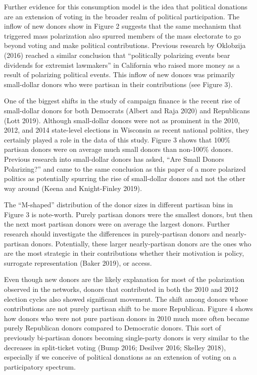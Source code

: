 \documentclass[12pt,]{article}
\begin{document}
Further evidence for this consumption model is the idea that political
donations are an extension of voting in the broader realm of political
participation. The inflow of new donors show in Figure 2 suggests that
the same mechanism that triggered mass polarization also spurred members
of the mass electorate to go beyond voting and make political
contributions. Previous research by Oklobzija (2016) reached a similar
conclusion that ``politically polarizing events bear dividends for
extremist lawmakers'' in California who raised more money as a result of
polarizing political events. This inflow of new donors was primarily
small-dollar donors who were partisan in their contributions (see Figure
3).

One of the biggest shifts in the study of campaign finance is the recent
rise of small-dollar donors for both Democrats (Albert and Raja 2020)
and Republicans (Lott 2019). Although small-dollar donors were not as
prominent in the 2010, 2012, and 2014 state-level elections in Wisconsin
as recent national politics, they certainly played a role in the data of
this study. Figure 3 shows that 100\% partisan donors were on average
much small donors than non-100\% donors. Previous research into
small-dollar donors has asked, ``Are Small Donors Polarizing?'' and came
to the same conclusion as this paper of a more polarized politics as
potentially spurring the rise of small-dollar donors and not the other
way around (Keena and Knight-Finley 2019).

The ``M-shaped'' distribution of the donor sizes in different partisan
bins in Figure 3 is note-worth. Purely partisan donors were the smallest
donors, but then the next most partisan donors were on average the
largest donors. Further research should investigate the differences in
purely-partisan donors and nearly-partisan donors. Potentially, these
larger nearly-partisan donors are the ones who are the most strategic in
their contributions whether their motivation is policy, surrogate
representation (Baker 2019), or access.

Even though new donors are the likely explanation for most of the
polarization observed in the networks, donors that contributed in both
the 2010 and 2012 election cycles also showed significant movement. The
shift among donors whose contributions are not purely partisan shift to
be more Republican. Figure 4 shows how donors who were not pure partisan
donors in 2010 much more often became purely Republican donors compared
to Democratic donors. This sort of previously bi-partisan donors
becoming single-party donors is very similar to the decreases in
split-ticket voting (Bump 2016; Desilver 2016; Skelley 2018), especially
if we conceive of political donations as an extension of voting on a
participatory spectrum.
\end{document}
